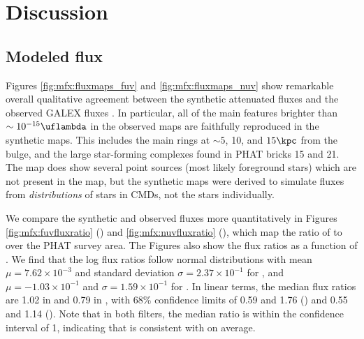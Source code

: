 \section{Discussion}\label{mfx:discussion}

\subsection{Modeled flux}\label{mfx:discussion:modflux}

Figures \ref{fig:mfx:fluxmaps_fuv} and \ref{fig:mfx:fluxmaps_nuv} show
remarkable overall qualitative agreement between the synthetic attenuated
fluxes \fxsfh{} and the observed GALEX fluxes \fxobs{}. In particular, all of
the main features brighter than $\sim 10^{-15}\uflambda$ in the observed maps
are faithfully reproduced in the synthetic maps. This includes the main rings
at $\sim 5$, 10, and $15\kpc$ from the bulge, and the large star-forming
complexes found in PHAT bricks 15 and 21. The \fnuvobs{} map does show several
point sources (most likely foreground stars) which are not present in the
\fnuvsfh{} map, but the synthetic maps were derived to simulate fluxes from
\emph{distributions} of stars in CMDs, not the stars individually.

We compare the synthetic and observed fluxes more quantitatively in Figures
\ref{fig:mfx:fuvfluxratio} (\fuv{}) and \ref{fig:mfx:nuvfluxratio} (\nuv{}),
which map the ratio of \fxsfh{} to \fxobs{} over the PHAT survey area. The
Figures also show the flux ratios as a function of \fxobs{}. We find that the
log flux ratios follow normal distributions with mean $\mu = 7.62\times
10^{-3}$ and standard deviation $\sigma = 2.37\times 10^{-1}$ for \fuv{}, and
$\mu = -1.03\times 10^{-1}$ and $\sigma = 1.59\times 10^{-1}$ for \nuv{}. In
linear terms, the median flux ratios are 1.02 in \fuv{} and 0.79 in \nuv{},
with 68\% confidence limits of 0.59 and 1.76 (\fuv{}) and 0.55 and 1.14
(\nuv{}). Note that in both filters, the median ratio is within the confidence
interval of 1, indicating that \fxsfh{} is consistent with \fxobs{} on average.


